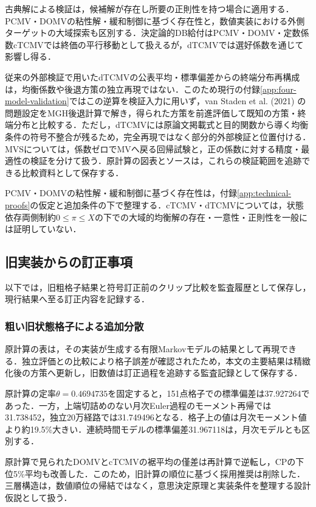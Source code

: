 \documentclass[10pt,a4paper]{article}
\theoremstyle{plain}
\theoremstyle{definition}
\begin{document}
古典解による検証は，候補解が存在し所要の正則性を持つ場合に適用する．PCMV・DOMVの粘性解・緩和制御に基づく存在性と，数値実装における外側ターゲットの大域探索も区別する．決定論的DB給付はPCMV・DOMV・定数係数cTCMVでは終価の平行移動として扱えるが，dTCMVでは選好係数を通じて影響し得る．

従来の外部検証で用いたdTCMVの公表平均・標準偏差からの終端分布再構成は，均衡係数や後退方策の独立再現ではない．このため現行の付録\ref{app:four-model-validation}ではこの逆算を検証入力に用いず，van Staden et al. (2021) の問題設定をMGH後退計算で解き，得られた方策を前進評価して既知の方策・終端分布と比較する．ただし，dTCMVには原論文掲載式と目的関数から導く均衡条件の符号不整合が残るため，完全再現ではなく部分的外部検証と位置付ける．MVSについては，係数ゼロでMVへ戻る回帰試験と，正の係数に対する精度・最適性の検証を分けて扱う．原計算の図表とソースは，これらの検証範囲を追跡できる比較資料として保存する．

PCMV・DOMVの粘性解・緩和制御に基づく存在性は，付録\ref{app:technical-proofs}の仮定と追加条件の下で整理する．cTCMV・dTCMVについては，状態依存両側制約$0\leq\pi\leq X$の下での大域的均衡解の存在・一意性・正則性を一般には証明していない．

\subsection{旧実装からの訂正事項}\label{app:legacy-corrections}
以下では，旧粗格子結果と符号訂正前のクリップ比較を監査履歴として保存し，現行結果へ至る訂正内容を記録する．

\subsubsection{粗い旧状態格子による追加分散}
原計算の表は，その実装が生成する有限Markovモデルの結果として再現できる．独立評価との比較により格子誤差が確認されたため，本文の主要結果は精緻化後の方策へ更新し，旧数値は訂正過程を追跡する監査記録として保存する．

原計算の定率$\theta=0.4694735$を固定すると，151点格子での標準偏差は37.927264であった．一方，上端切詰めのない月次Euler過程のモーメント再帰では31.738452，独立20万経路では31.749496となる．格子上の値は月次モーメント値より約19.5\%大きい．連続時間モデルの標準偏差31.967118は，月次モデルとも区別する．

原計算で見られたDOMVとcTCMVの裾平均の僅差は再計算で逆転し，CPの下位5\%平均も改善した．このため，旧計算の順位に基づく採用推奨は削除した．三層構造は，数値順位の帰結ではなく，意思決定原理と実装条件を整理する設計仮説として扱う．
\end{document}
